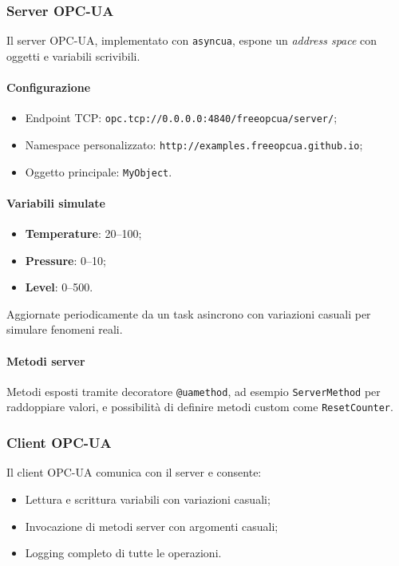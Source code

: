 \subsubsection{Server OPC-UA}

Il server OPC-UA, implementato con \texttt{asyncua}, espone un \textit{address space} con oggetti e variabili scrivibili.  

\paragraph{Configurazione}
\begin{itemize}
    \item Endpoint TCP: \texttt{opc.tcp://0.0.0.0:4840/freeopcua/server/};
    \item Namespace personalizzato: \texttt{http://examples.freeopcua.github.io};
    \item Oggetto principale: \texttt{MyObject}.
\end{itemize}

\paragraph{Variabili simulate}
\begin{itemize}
    \item \textbf{Temperature}: 20--100;
    \item \textbf{Pressure}: 0--10;
    \item \textbf{Level}: 0--500.
\end{itemize}
Aggiornate periodicamente da un task asincrono con variazioni casuali per simulare fenomeni reali.

\paragraph{Metodi server}
Metodi esposti tramite decoratore \texttt{@uamethod}, ad esempio \texttt{ServerMethod} per raddoppiare valori, e possibilità di definire metodi custom come \texttt{ResetCounter}.

\subsubsection{Client OPC-UA}

Il client OPC-UA comunica con il server e consente:

\begin{itemize}
    \item Lettura e scrittura variabili con variazioni casuali;
    \item Invocazione di metodi server con argomenti casuali;
    \item Logging completo di tutte le operazioni.
\end{itemize}

